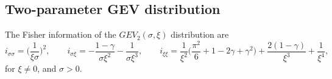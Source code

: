 \documentclass{article}
\newcommand{\1}{\mathds{1}}
\theoremstyle{definition}
\begin{document}

\subsection{Two-parameter GEV distribution}\label{sec:GEV2_fisher}
The Fisher information of the $GEV_2(\sigma,\xi)$ distribution are
    \begin{equation*}
        i_{\sigma\sigma} = \Big(\frac{1}{\xi \sigma}\Big)^2, \quad\quad i_{\sigma\xi} =-\frac{1-\gamma}{\sigma\xi^2}-\frac{1}{\sigma\xi^3}, \quad\quad i_{\xi\xi} = \frac{1}{\xi^2}\Big(\frac{\pi^2}{6}+1-2\gamma+\gamma^2\Big)+\frac{2(1-\gamma)}{\xi^3}+\frac{1}{\xi^4},
    \end{equation*}
for $\xi \ne 0$, and $\sigma>0$.
\end{document}
